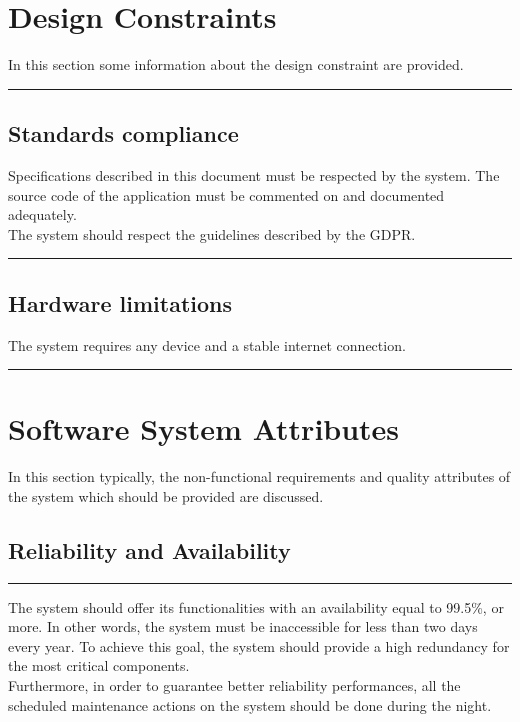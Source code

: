 \documentclass{Configuration_Files/Template}
\begin{document}
\section{Design Constraints}

In this section some information about the design constraint are provided.

{\color{bluepoli}\rule{\linewidth}{0.1pt}}

\subsection{Standards compliance}

Specifications described in this document must be respected by the system. The source code of the application must be commented on and documented adequately.\\
The system should respect the guidelines described by the GDPR.

{\color{bluepoli}\rule{\linewidth}{0.1pt}}

\subsection{Hardware limitations}

The system requires any device and a stable internet connection.

{\color{bluepoli}\rule{\linewidth}{0.1pt}}

\section{Software System Attributes}

In this section typically, the non-functional requirements and quality attributes of the system which should be provided are discussed. 

\subsection{Reliability and Availability}

{\color{bluepoli}\rule{\linewidth}{0.1pt}}

The system should offer its functionalities with an availability equal to 99.5\%, or more. In other words, the system must be inaccessible for less than two days every year. To achieve this goal, the system should provide a high redundancy for the most critical components.\\
Furthermore, in order to guarantee better reliability performances, all the scheduled maintenance actions on the system should be done during the night.\\
\end{document}

